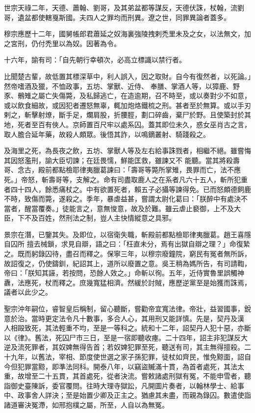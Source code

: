 \begin{pinyinscope}
 世宗天祿二年，天德、蕭翰、劉哥，及其弟盆都等謀反，天德伏誅，杖翰，流劉哥，遺盆都使轄戛斯國。夫四人之罪均而刑異。遼之世，同罪異論者蓋多。



 穆宗應歷十二年，國舅帳郎君蕭延之奴海裏強陵拽剌禿里未及之女，以法無文，加之宮刑，仍付禿里以為奴。因著為令。



 十六年，諭有司：「自先朝行幸頓次，必高立標識以禁行者。



 比聞楚古輩，故低置其標深草中，利人誤入，因之取財。自今有復然者，以死論。」然帝嗜酒及獵，不恤政事，五坊、掌獸、近侍、
 奉膳、掌酒人等，以獐鹿、野豕、鶻雉之屬亡失傷斃，及私歸逃亡，在造逾期，召不時至，或以奏對少不如意，或以飲食細故，或因犯者遷怒無辜，輒加炮烙鐵梳之刑。甚者至於無算。或以手刃剌之，斬擊射燎，斷手足，爛肩股，折腰脛，劃口碎齒，棄尸於野。且使築封於其地，死者至百有俠人。京師置百尺牢以處系囚。蓋其即位未久，惑女巫肖古之言，取人膽合延年藥，故殺人頗眾。後悟其詐，以鳴鏑叢射、騎踐殺之。



 及海里之死，為長夜之飲，五坊、掌獸人等及左右給事誅戮者，相繼不絕。雖嘗悔其因怒濫刑，諭大臣切諫；在廷畏懦，鮮能匡救，雖諫又不
 能聽。當其將殺壽哥、念古，殿前都點檢耶律夷臘葛諫曰：「壽哥等斃所掌雉，畏罪而亡，法不應死。」帝怒，斬壽哥等，支解之。命有司盡取鹿人之在系者凡六十五人，斬所犯重者四十四人，餘悉痛杖之。中有欲置死者，賴五子必攝等諫得免。已而怒頗德飼鹿不時，致傷而斃，遂殺之。季年，暴虐益甚，嘗謂太尉化葛曰：「朕醉中有處決不當者，醒當覆奏。」徒能言之，意無悛意，故及於難。雖云虐止褻御，上不及大臣，下不及百姓，然刑法之制，豈人主快情縱意之具邪。



 景宗在潛，已鑒其失。及即位，以宿衛失職，斬殿前都點檢耶律夷臘葛。趙王喜隱自囚所
 擅去械鎖，求見自辯，語之曰：「枉直未分，焉有出獄自辯之理？」命復縶之。既而躬錄囚待，盡召而釋之。保寧三年，以穆宗廢鐘院，窮民有冤者無所訴，故詔復之，仍使鑄釧，紀詔其上，道所以廢置之意。吳王稍為媽所告，有司請鞫，帝曰：「朕知其誣，若按問，恐餘人效之。」命斬以徇。五年，近侍實魯里誤觸神纛，法應死，杖而釋之。庶幾寬猛相濟。然緩於討賊，應歷逆黨至是始獲而誅焉，議者以此少之。



 聖宗沖年嗣位，睿智皇后稱制，留心聽斷，嘗勸帝宜寬法律。帝壯，益習國事，銳意於治。當時更定法令凡十數事，多合人心，其用刑又能詳慎。先是，契丹及漢
 人相毆致死，其法輕重不均，至是一等科之。統和十二年，詔契丹人犯十惡，亦斷以《律》。舊法，死囚尸市三日，至是一宿即聽收瘞。二十四年，詔主非犯謀反大逆及流死罪者，其奴婢無得告首；若奴婢犯罪至死，聽送有司，其主無得擅殺。二十九年，以舊法，宰相、節度使世選之家子孫犯罪，徒杖如齊民，惟免黥面，詔自今但犯罪當黥，即準法同科。開泰八年，以竊盜贓滿十貫，為首者處死，其法太重，故增至二十五貫，其首處死，從者決流。嘗敕諸處刑獄有冤，不能申雪者，聽詣御史臺陳訴，委官覆問。往時大理寺獄訟，凡開圖片奏者，以翰林學士、給事
 中、政事舍人詳決；至是始置少卿及正主之。猶慮其未盡，而親為錄囚。數遣使詣諸道審決冤滯，如邢抱樸之屬，所至，人自以為無冤。




\end{pinyinscope}
